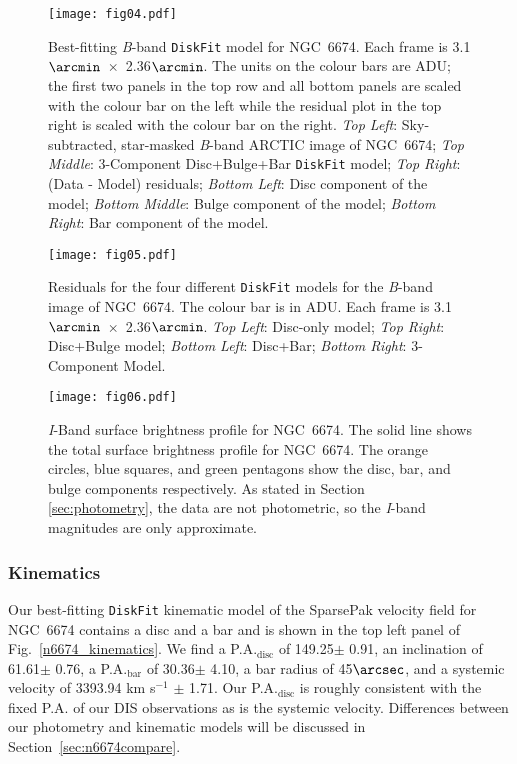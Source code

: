 \documentclass[a4paper,fleqn,usenatbib]{mnras}
\begin{document}
\begin{figure*}
	\center
	\texttt{[image: fig04.pdf]}
  	\caption{Best-fitting \textit{B}-band \texttt{DiskFit} model for NGC~6674. Each frame is 3.1$\arcmin$~$\times$~2.36$\arcmin$. The units on the colour bars are ADU; the first two panels in the top row and all bottom panels are scaled with the colour bar on the left while the residual plot in the top right is scaled with the colour bar on the right. \textit{Top Left}: Sky-subtracted, star-masked \textit{B}-band ARCTIC image of NGC~6674; \textit{Top Middle}: 3-Component Disc+Bulge+Bar \texttt{DiskFit} model; \textit{Top Right}: (Data - Model) residuals; \textit{Bottom Left}: Disc component of the model; \textit{Bottom Middle}: Bulge component of the model; \textit{Bottom Right}: Bar component of the model.}
  	\label{n6674_b}
\end{figure*}

\begin{figure}
	\center
	\texttt{[image: fig05.pdf]}
	\caption{Residuals for the four different \texttt{DiskFit} models for the \textit{B}-band image of NGC~6674. The colour bar is in ADU. Each frame is 3.1$\arcmin$~$\times$~2.36$\arcmin$. \textit{Top Left}: Disc-only model; \textit{Top Right}: Disc+Bulge model; \textit{Bottom Left}: Disc+Bar; \textit{Bottom Right}: 3-Component Model.}
	\label{n6674_res}
\end{figure}

\begin{figure}
	\center
    	\texttt{[image: fig06.pdf]}
  	\caption{\textit{I}-Band surface brightness profile for NGC~6674. The solid line shows the total surface brightness profile for NGC~6674. The orange circles, blue squares, and green pentagons show the disc, bar, and bulge components respectively. As stated in Section \ref{sec:photometry}, the data are not photometric, so the \textit{I}-band magnitudes are only approximate.}
  	\label{n6674_colour}
\end{figure}

\subsubsection{Kinematics}
\label{sec:n6674kine}

Our best-fitting \texttt{DiskFit} kinematic model of the SparsePak velocity field for NGC~6674 contains a disc and a bar and is shown in the top left panel of Fig.~\ref{n6674_kinematics}. We find a P.A.$_{\mathrm{disc}}$ of 149.25\degr $\pm$ 0.91\degr, an inclination of 61.61\degr $\pm$ 0.76\degr, a P.A.$_{\mathrm{bar}}$ of 30.36\degr $\pm$ 4.10\degr, a bar radius of 45$\arcsec$, and a systemic velocity of 3393.94 km s$^{-1}$ $\pm$ 1.71. Our P.A.$_{\mathrm{disc}}$ is roughly consistent with the fixed P.A. of our DIS observations as is the systemic velocity. Differences between our photometry and kinematic models will be discussed in Section~\ref{sec:n6674compare}.
\end{document}
